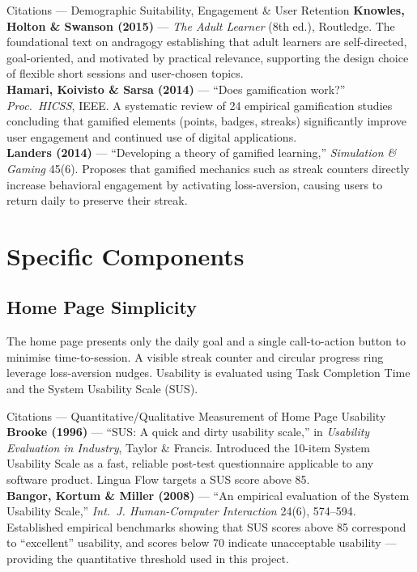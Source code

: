 \documentclass[10pt,a4paper]{article}
\begin{document}
\begin{citationbox}{Citations --- Demographic Suitability, Engagement \& User Retention}
\textbf{Knowles, Holton \& Swanson (2015)} --- \emph{The Adult Learner} (8th ed.), Routledge. The foundational text on andragogy establishing that adult learners are self-directed, goal-oriented, and motivated by practical relevance, supporting the design choice of flexible short sessions and user-chosen topics.\\[3pt]
\textbf{Hamari, Koivisto \& Sarsa (2014)} --- ``Does gamification work?'' \emph{Proc.\ HICSS}, IEEE. A systematic review of 24 empirical gamification studies concluding that gamified elements (points, badges, streaks) significantly improve user engagement and continued use of digital applications.\\[3pt]
\textbf{Landers (2014)} --- ``Developing a theory of gamified learning,'' \emph{Simulation \& Gaming} 45(6). Proposes that gamified mechanics such as streak counters directly increase behavioral engagement by activating loss-aversion, causing users to return daily to preserve their streak.
\end{citationbox}

\section{Specific Components}

\subsection{Home Page Simplicity}
The home page presents only the daily goal and a single call-to-action button to minimise time-to-session. A visible streak counter and circular progress ring leverage loss-aversion nudges. Usability is evaluated using Task Completion Time and the System Usability Scale (SUS).

\begin{citationbox}{Citations --- Quantitative/Qualitative Measurement of Home Page Usability}
\textbf{Brooke (1996)} --- ``SUS: A quick and dirty usability scale,'' in \emph{Usability Evaluation in Industry}, Taylor \& Francis. Introduced the 10-item System Usability Scale as a fast, reliable post-test questionnaire applicable to any software product. Lingua Flow targets a SUS score above 85.\\[3pt]
\textbf{Bangor, Kortum \& Miller (2008)} --- ``An empirical evaluation of the System Usability Scale,'' \emph{Int.\ J. Human-Computer Interaction} 24(6), 574--594. Established empirical benchmarks showing that SUS scores above 85 correspond to ``excellent'' usability, and scores below 70 indicate unacceptable usability --- providing the quantitative threshold used in this project.
\end{citationbox}
\end{document}
